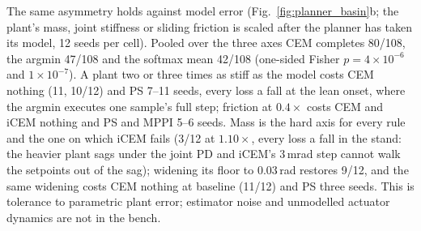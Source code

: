 The same asymmetry holds against model error (Fig.~\ref{fig:planner_basin}b;
the plant's mass, joint stiffness or sliding friction is scaled after the
planner has taken its model, 12 seeds per cell). Pooled over the three axes
CEM completes 80/108, the argmin 47/108 and the softmax mean 42/108 (one-sided
Fisher $p=4\times10^{-6}$ and $1\times10^{-7}$). A plant two or three times as
stiff as the model costs CEM nothing (11, 10/12) and PS 7--11 seeds, every loss
a fall at the lean onset, where the argmin executes one sample's full step;
friction at $0.4\times$ costs CEM and iCEM nothing and PS and MPPI 5--6 seeds.
Mass is the hard axis for every rule and the one on which iCEM fails (3/12 at
$1.10\times$, every loss a fall in the stand: the heavier plant sags under the
joint PD and iCEM's $3$\,mrad step cannot walk the setpoints out of the sag);
widening its floor to $0.03$\,rad restores 9/12, and the same widening costs
CEM nothing at baseline (11/12) and PS three seeds. This is tolerance to
parametric plant error; estimator noise and unmodelled actuator dynamics are
not in the bench.
